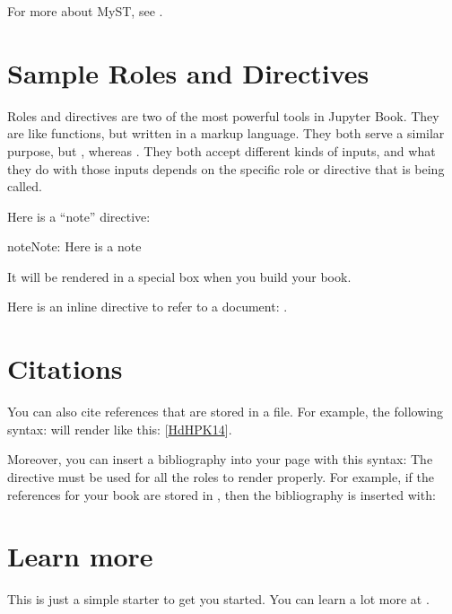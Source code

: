 \documentclass[letterpaper,10pt,english]{jupyterBook}
\begin{document}
\sphinxAtStartPar
For more about MyST, see .


\section{Sample Roles and Directives}
\label{\detokenize{markdown:sample-roles-and-directives}}
\sphinxAtStartPar
Roles and directives are two of the most powerful tools in Jupyter Book. They
are like functions, but written in a markup language. They both
serve a similar purpose, but , whereas
. They both accept different kinds of inputs,
and what they do with those inputs depends on the specific role or directive
that is being called.

\sphinxAtStartPar
Here is a “note” directive:

\begin{sphinxadmonition}{note}{Note:}
\sphinxAtStartPar
Here is a note
\end{sphinxadmonition}

\sphinxAtStartPar
It will be rendered in a special box when you build your book.

\sphinxAtStartPar
Here is an inline directive to refer to a document: {\hyperref[\detokenize{markdown-notebooks::doc}]{}}.


\section{Citations}
\label{\detokenize{markdown:citations}}
\sphinxAtStartPar
You can also cite references that are stored in a  file. For example,
the following syntax:  will render like
this: {[}\hyperlink{cite.markdown:id3}{HdHPK14}{]}.

\sphinxAtStartPar
Moreover, you can insert a bibliography into your page with this syntax:
The  directive must be used for all the  roles to
render properly.
For example, if the references for your book are stored in ,
then the bibliography is inserted with:


\section{Learn more}
\label{\detokenize{markdown:learn-more}}
\sphinxAtStartPar
This is just a simple starter to get you started.
You can learn a lot more at .
\end{document}
